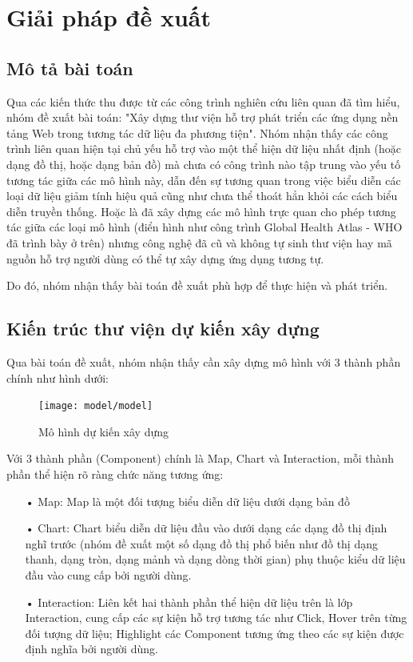 \documentclass[12pt,a4paper,oneside]{article}
\begin{document}
\section{Giải pháp đề xuất}
\subsection{Mô tả bài toán}
Qua các kiến thức thu được từ các công trình nghiên cứu liên quan đã tìm hiểu, nhóm đề xuất bài toán: "Xây dựng thư viện hỗ trợ phát triển các ứng dụng nền tảng Web trong tương tác dữ liệu đa phương tiện". Nhóm nhận thấy các công trình liên quan hiện tại chủ yếu hỗ trợ vào một thể hiện dữ liệu nhất định (hoặc dạng đồ thị, hoặc dạng bản đồ) mà chưa có công trình nào tập trung vào yếu tố tương tác giữa các mô hình này, dẫn đến sự tương quan trong việc biểu diễn các loại dữ liệu giảm tính hiệu quả cũng như chưa thể thoát hẳn khỏi các cách biểu diễn truyền thống. Hoặc là đã  xây dựng các mô hình trực quan cho phép tương tác giữa các loại mô hình (điển hình như công trình Global Health Atlas - WHO đã trình bày ở trên) nhưng công nghệ đã cũ và không tự sinh thư viện hay mã nguồn hỗ trợ người dùng có thể tự xây dựng ứng dụng tương tự.

Do đó, nhóm nhận thấy bài toán đề xuất phù hợp để thực hiện và phát triển.

\subsection{Kiến trúc thư viện dự kiến xây dựng}
Qua bài toán đề xuất, nhóm nhận thấy cần xây dựng mô hình với 3 thành phần chính như hình dưới:

\begin{figure}[htp]
	\begin{center}
    \texttt{[image: model/model]}
    \caption{Mô hình dự kiến xây dựng}
    \label{refhinh16}
	\end{center}
\end{figure}

Với 3 thành phần (Component) chính là Map, Chart và Interaction, mỗi thành phần thể hiện rõ ràng chức năng tương ứng: 
\begin{itemize}
\item[•] Map: 
Map là một đối tượng biểu diễn dữ liệu dưới dạng bản đồ
\item[•] Chart:
Chart biểu diễn dữ liệu đầu vào dưới dạng các dạng đồ thị định nghĩ trước (nhóm đề xuất một số dạng đồ thị phổ biến như đồ thị dạng thanh, dạng tròn, dạng mảnh và dạng dòng thời gian) phụ thuộc kiểu dữ liệu đầu vào cung cấp bởi người dùng.
\item[•] Interaction:
Liên kết hai thành phần thể hiện dữ liệu trên là lớp Interaction, cung cấp các sự kiện hỗ trợ tương tác như Click, Hover trên từng đối tượng dữ liệu; Highlight các Component tương ứng theo các sự kiện được định nghĩa bởi người dùng.
\end{itemize}
\end{document}
